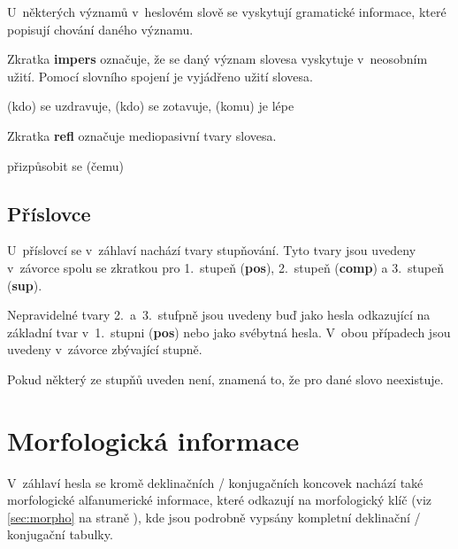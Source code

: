 U~některých významů v~heslovém slově se vyskytují gramatické informace, které popisují chování daného významu.

Zkratka \textbf{impers} označuje, že se daný význam slovesa vyskytuje v~neosobním užití. Pomocí slovního spojení je vyjádřeno užití slovesa.

\blspace
  \dicEntry {}     (kdo) se uzdravuje, (kdo) se zotavuje, (komu) je lépe
\blspace

Zkratka \textbf{refl} označuje mediopasivní tvary slovesa.

\blspace
  \dicEntry {}     {přizpůsobit se (čemu)}
\blspace

\subsection*{Příslovce}

U~příslovcí se v~záhlaví nachází tvary stupňování. Tyto tvary jsou uvedeny v~závorce spolu se zkratkou pro 1.~stupeň (\textbf{pos}), 2.~stupeň (\textbf{comp}) a 3.~stupeň (\textbf{sup}).

\blspace
  \dicEntry {}  
\blspace

Nepravidelné tvary 2.~a~3.~stufpně jsou uvedeny buď jako hesla odkazující na základní tvar v~1.~stupni (\textbf{pos}) nebo jako svébytná hesla. V~obou případech jsou uvedeny v~závorce zbývající stupně.

\blspace
  \dicEntry {}  
\blspace

Pokud některý ze stupňů uveden není, znamená to, že pro dané slovo neexistuje.

\blspace
  \dicEntry {}  
\blspace

\section{Morfologická informace} \label{sec:dec}

V~záhlaví hesla se kromě deklinačních / konjugačních koncovek nachází také morfologické alfanumerické informace, které odkazují na morfologický klíč (viz \ref{sec:morpho} na straně \pageref{sec:morpho}), kde jsou podrobně vypsány kompletní deklinační / konjugační tabulky.

